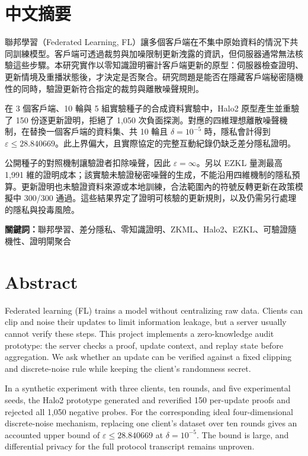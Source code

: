 \documentclass[12pt,a4paper]{article}
\newcommand{\eps}{\varepsilon}
\begin{document}
\section*{中文摘要}
聯邦學習（Federated Learning, FL）讓多個客戶端在不集中原始資料的情況下共同訓練模型。客戶端可透過裁剪與加噪限制更新洩露的資訊，但伺服器通常無法核驗這些步驟。本研究實作以零知識證明審計客戶端更新的原型：伺服器檢查證明、更新情境及重播狀態後，才決定是否聚合。研究問題是能否在隱藏客戶端秘密隨機性的同時，驗證更新符合指定的裁剪與離散噪聲規則。

在 3 個客戶端、10 輪與 5 組實驗種子的合成資料實驗中，Halo2 原型產生並重驗了 150 份逐更新證明，拒絕了 1,050 次負面探測。對應的四維理想離散噪聲機制，在替換一個客戶端的資料集、共 10 輪且 $\delta=10^{-5}$ 時，隱私會計得到 $\eps\le 28.840669$。此上界偏大，且實際協定的完整互動紀錄仍缺乏差分隱私證明。

公開種子的對照機制讓驗證者扣除噪聲，因此 $\eps=\infty$。另以 EZKL 量測最高 1,991 維的證明成本；該實驗未驗證秘密噪聲的生成，不能沿用四維機制的隱私預算。更新證明也未驗證資料來源或本地訓練，合法範圍內的符號反轉更新在政策模擬中 300/300 通過。這些結果界定了證明可核驗的更新規則，以及仍需另行處理的隱私與投毒風險。

\noindent\textbf{關鍵詞：}聯邦學習、差分隱私、零知識證明、ZKML、Halo2、EZKL、可驗證隨機性、證明閘聚合

\clearpage
\section*{Abstract}
Federated learning (FL) trains a model without centralizing raw data. Clients can clip and noise their updates to limit information leakage, but a server usually cannot verify these steps. This project implements a zero-knowledge audit prototype: the server checks a proof, update context, and replay state before aggregation. We ask whether an update can be verified against a fixed clipping and discrete-noise rule while keeping the client's randomness secret.

In a synthetic experiment with three clients, ten rounds, and five experimental seeds, the Halo2 prototype generated and reverified 150 per-update proofs and rejected all 1,050 negative probes. For the corresponding ideal four-dimensional discrete-noise mechanism, replacing one client's dataset over ten rounds gives an accounted upper bound of $\eps\le 28.840669$ at $\delta=10^{-5}$. The bound is large, and differential privacy for the full protocol transcript remains unproven.
\end{document}
